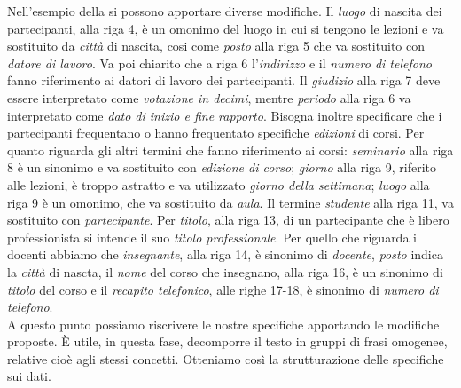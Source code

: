 \documentclass[12pt]{report}
\newcommand{\namerefl}[1]{%
	\bgroup
	\let\nmu\MakeLowercase
	\nameref{#1}\egroup}
\newcommand{\nmu}{}
\begin{document}
 	Nell'esempio della \namerefl{exa:societa_formazione} si possono apportare diverse modifiche. Il \textit{luogo} di nascita dei partecipanti, alla riga 4, è un omonimo del luogo in cui si tengono le lezioni e va sostituito da \textit{città} di nascita, cosi come \textit{posto} alla riga 5 che va sostituito con \textit{datore di lavoro}. Va poi chiarito che a riga 6 l'\textit{indirizzo} e il \textit{numero di telefono} fanno riferimento ai datori di lavoro dei partecipanti. Il  \textit{giudizio} alla riga 7 deve essere interpretato come \textit{votazione in decimi}, mentre \textit{periodo} alla riga 6 va interpretato come \textit{dato di inizio e fine rapporto}. Bisogna inoltre specificare che i partecipanti frequentano o hanno frequentato specifiche \textit{edizioni} di corsi. Per quanto riguarda gli altri termini che fanno riferimento ai corsi: \textit{seminario} alla riga 8 è un sinonimo e va sostituito con \textit{edizione di corso}; \textit{giorno} alla riga 9, riferito alle lezioni, è troppo astratto e va utilizzato \textit{giorno della settimana}; \textit{luogo} alla riga 9 è un omonimo, che va sostituito da \textit{aula}. Il termine \textit{studente} alla riga 11, va sostituito con \textit{partecipante}. Per \textit{titolo}, alla riga 13, di un partecipante che è libero professionista si intende il suo \textit{titolo professionale}. Per quello che riguarda i docenti abbiamo che \textit{insegnante}, alla riga 14, è sinonimo di \textit{docente}, \textit{posto} indica la \textit{città} di nascta, il \textit{nome} del corso che insegnano, alla riga 16, è un sinonimo di \textit{titolo} del corso e il \textit{recapito telefonico}, alle righe 17-18, è sinonimo di \textit{numero di telefono}. \\
 	A questo punto possiamo riscrivere le nostre specifiche apportando le modifiche proposte. È utile, in questa fase, decomporre il testo in gruppi di frasi omogenee, relative cioè agli stessi concetti. Otteniamo così la strutturazione delle specifiche sui dati.
\end{document}
